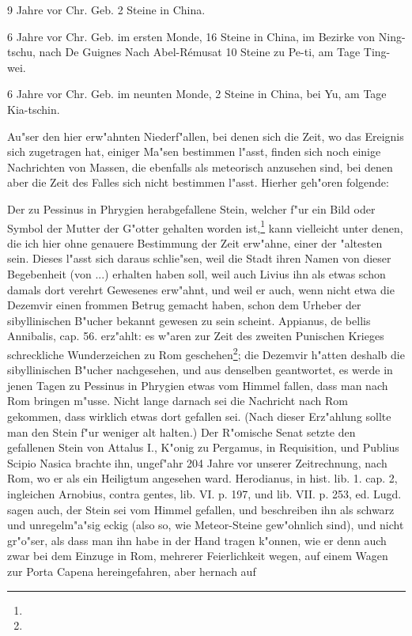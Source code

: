 \documentclass[a4paper, 11pt, oneside, polutonikogreek, german]{article}
\begin{document}
9 Jahre vor Chr. Geb. 2 Steine in China.

6 Jahre vor Chr. Geb. im ersten Monde, 16 Steine in China, im Bezirke von Ning-tschu, nach De Guignes Nach Abel-Rémusat 10 Steine zu Pe-ti, am Tage Ting-wei.

6 Jahre vor Chr. Geb. im neunten Monde, 2 Steine in China, bei Yu, am Tage Kia-tschin.

Au"ser den hier erw"ahnten Niederf"allen, bei denen sich die Zeit, wo das Ereignis sich zugetragen hat, einiger Ma"sen bestimmen l"asst, finden sich noch einige Nachrichten von Massen, die ebenfalls als meteorisch anzusehen sind, bei denen aber die Zeit des Falles sich nicht bestimmen l"asst. Hierher geh"oren folgende:

Der zu Pessinus in Phrygien herabgefallene Stein, welcher f"ur ein Bild oder Symbol der Mutter der G"otter gehalten worden ist,\footnote{} kann vielleicht unter denen, die ich hier ohne genauere Bestimmung der Zeit erw"ahne, einer der "altesten sein. Dieses l"asst sich daraus schlie"sen, weil die Stadt ihren Namen von dieser Begebenheit (von ...) erhalten haben soll, weil auch Livius ihn als etwas schon damals dort verehrt Gewesenes erw"ahnt, und weil er auch, wenn nicht etwa die Dezemvir einen frommen Betrug gemacht haben, schon dem Urheber der sibyllinischen B"ucher bekannt gewesen zu sein scheint. Appianus, de bellis Annibalis, cap. 56. erz"ahlt: es w"aren zur Zeit des zweiten Punischen Krieges schreckliche Wunderzeichen zu Rom geschehen\footnote{}; die Dezemvir h"atten deshalb die sibyllinischen B"ucher nachgesehen, und aus denselben geantwortet, es werde in jenen Tagen zu Pessinus in Phrygien etwas vom Himmel fallen, dass man nach Rom bringen m"usse. Nicht lange darnach sei die Nachricht nach Rom gekommen, dass wirklich etwas dort gefallen sei. (Nach dieser Erz"ahlung sollte man den Stein f"ur weniger alt halten.) Der R"omische Senat setzte den gefallenen Stein von Attalus I., K"onig zu Pergamus, in Requisition, und Publius Scipio Nasica brachte ihn, ungef"ahr 204 Jahre vor unserer Zeitrechnung, nach Rom, wo er als ein Heiligtum angesehen ward. Herodianus, in hist. lib. 1. cap. 2, ingleichen Arnobius, contra gentes, lib. VI. p. 197, und lib. VII. p. 253, ed. Lugd. sagen auch, der Stein sei vom Himmel gefallen, und beschreiben ihn als schwarz und unregelm"a"sig eckig (also so, wie Meteor-Steine gew"ohnlich sind), und nicht gr"o"ser, als dass man ihn habe in der Hand tragen k"onnen, wie er denn auch zwar bei dem Einzuge in Rom, mehrerer Feierlichkeit wegen, auf einem Wagen zur Porta Capena hereingefahren, aber hernach auf 
\end{document}
